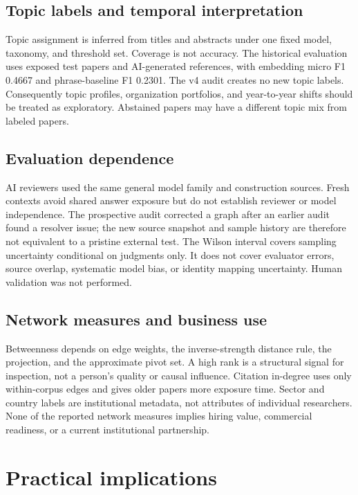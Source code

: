 \subsection{Topic labels and temporal interpretation}

Topic assignment is inferred from titles and abstracts under one fixed model,
taxonomy, and threshold set. Coverage is not accuracy. The historical evaluation
uses exposed test papers and AI-generated references, with embedding micro F1
0.4667 and phrase-baseline F1 0.2301. The v4 audit creates no new topic labels.
Consequently topic profiles, organization portfolios, and year-to-year shifts
should be treated as exploratory. Abstained papers may have a different topic
mix from labeled papers.

\subsection{Evaluation dependence}

AI reviewers used the same general model family and construction sources. Fresh
contexts avoid shared answer exposure but do not establish reviewer or model
independence. The prospective audit corrected a graph after an earlier audit
found a resolver issue; the new source snapshot and sample history are therefore
not equivalent to a pristine external test. The Wilson interval covers sampling
uncertainty conditional on judgments only. It does not cover evaluator errors,
source overlap, systematic model bias, or identity mapping uncertainty. Human
validation was not performed.

\subsection{Network measures and business use}

Betweenness depends on edge weights, the inverse-strength distance rule, the
projection, and the approximate pivot set. A high rank is a structural signal
for inspection, not a person's quality or causal influence. Citation in-degree
uses only within-corpus edges and gives older papers more exposure time. Sector
and country labels are institutional metadata, not attributes of individual
researchers. None of the reported network measures implies hiring value,
commercial readiness, or a current institutional partnership.

\section{Practical implications}

